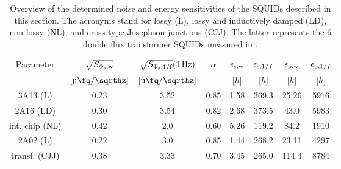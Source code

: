 \begin{table}[t!]
	\centering
	\begin{tabular}{c|*{7}{c}}
	\toprule
		Parameter & $\sqrt{S_{\rm \Phi_{\rm s},w}}$ & $\sqrt{S_{\rm \Phi_{\rm s},1/f}}(\qty{1}{\Hz})$ & $\alpha$ & $\epsilon_{\rm s,w}$ & $\epsilon_{{\rm s},1/f}$ & $\epsilon_{\rm p,w}$ & $\epsilon_{{\rm p},1/f}$ \\
		 & $[\unit[per-mode=symbol]{\micro\fq\per\sqrthz}]$ & $[\unit[per-mode=symbol]{\micro\fq\per\sqrthz}]$ &  & [$h$] & [$h$] & [$h$] & [$h$] \\
		\midrule
		3A13 (L) & 0.23 & 3.52 & 0.85 & 1.58 & 369.3 & 25.26 & 5916 \\
		2A16 (LD) & 0.30 & 3.54 & 0.82 & 2.68 & 373.5 & 43.0 & 5983 \\
		int. chip (NL) & 0.42 & 2.0 & 0.60 & 5.26 & 119.2 & 84.2 & 1910 \\
		2A02 (L) & 0.22 & 3.0 & 0.85 & 1.44 & 268.2 & 23.11 & 4297 \\
		transf. (CJJ) & 0.38 & 3.33 & 0.70 & 3.45 & 265.0 & 114.4 & 8784 \\
	\end{tabular}
	\caption{Overview of the determined noise and energy sensitivities of the SQUIDs described in this section. The acronyms stand for lossy (L), lossy and inductively damped (LD), non-lossy (NL), and cross-type Josephson junctions (CJJ). The latter represents the \qty{6}{\nH} double flux transformer SQUIDs measured in \cite{Bauer2022}.}
	\label{tab:noise}
\end{table}










